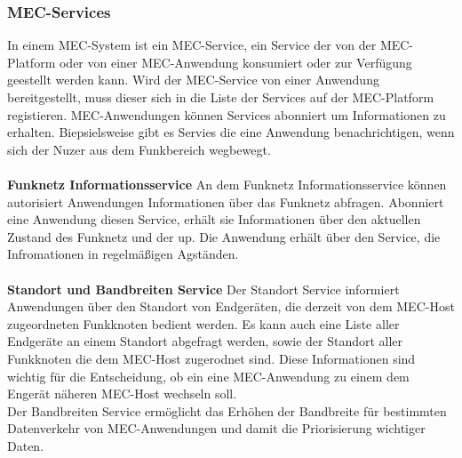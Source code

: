 \documentclass[runningheads]{llncs}
\numberwithin{figure}{section}
\begin{document}
\subsubsection{MEC-Services}
In einem MEC-System ist ein MEC-Service, ein Service der von der MEC-Platform oder von einer MEC-Anwendung konsumiert oder zur Verfügung geestellt werden kann. 
Wird der MEC-Service von einer Anwendung bereitgestellt, muss dieser sich in die Liste der Services auf der MEC-Platform registieren. MEC-Anwendungen können 
Services abonniert um Informationen zu erhalten. Biepsielsweise gibt es Servies die eine Anwendung benachrichtigen, wenn sich der Nuzer aus dem Funkbereich wegbewegt.
\\
\\
\textbf{Funknetz Informationsservice}
An dem Funknetz Informationsservice können autorisiert Anwendungen Informationen über das Funknetz abfragen.
Abonniert eine Anwendung diesen Service, erhält sie Informationen über den aktuellen Zustand des Funknetz und der \acrshort{up}. Die Anwendung erhält über den Service,
die Infromationen in regelmäßigen Agständen.
\\
\\
\textbf{Standort und Bandbreiten Service}
Der Standort Service informiert Anwendungen über den Standort von Endgeräten, 
die derzeit von dem MEC-Host zugeordneten Funkknoten bedient werden. 
Es kann auch eine Liste aller Endgeräte an einem Standort abgefragt werden, sowie der Standort aller
Funkknoten die dem MEC-Host zugerodnet sind. 
Diese Informationen sind wichtig für die Entscheidung, ob ein eine MEC-Anwendung zu einem dem Engerät näheren MEC-Host wechseln soll.
\\
Der Bandbreiten Service ermöglicht das Erhöhen der Bandbreite für bestimmten Datenverkehr von MEC-Anwendungen und damit die Priorisierung wichtiger Daten.
\end{document}
